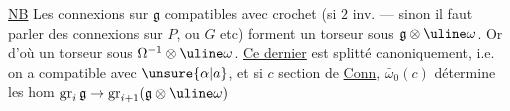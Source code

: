 \uline{NB} Les connexions sur $\mathfrak g$ compatibles avec
crochet 
(si $2$ inv. --- sinon il faut parler des connexions 
sur $P$, ou $G$ etc) forment un torseur sous $\mathfrak g\otimes\uline\omega$. Or
d'où un torseur sous $\Omega^{-1}\otimes\uline\omega$.
\uline{Ce dernier} est splitté canoniquement, i.e. on a
compatible avec $\unsure{\alpha|a}$, et si $c$ section de \uline{Conn},
$\bar\omega_0(c)$ détermine les hom
$\operatorname{gr}_i\mathfrak g\to\operatorname{gr}_{i+1}(\mathfrak g\otimes\uline\omega)$

